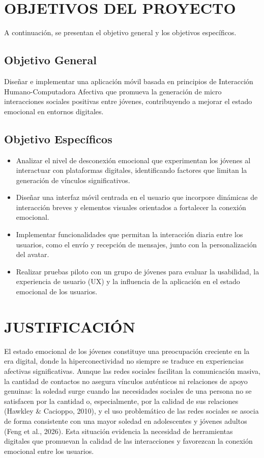 \section{OBJETIVOS DEL PROYECTO}
A continuación, se presentan el objetivo general y los objetivos específicos.

\subsection{Objetivo General}
Diseñar e implementar una aplicación móvil basada en principios de Interacción Humano-Computadora Afectiva que promueva la generación de micro interacciones sociales positivas entre jóvenes, contribuyendo a mejorar el estado emocional en entornos digitales.

\subsection{Objetivo Específicos}
\begin{itemize}
    \item Analizar el nivel de desconexión emocional que experimentan los jóvenes al interactuar con plataformas digitales, identificando factores que limitan la generación de vínculos significativos.
    \item Diseñar una interfaz móvil centrada en el usuario que incorpore dinámicas de interacción breves y elementos visuales orientados a fortalecer la conexión emocional.
    \item Implementar funcionalidades que permitan la interacción diaria entre los usuarios, como el envío y recepción de mensajes, junto con la personalización del avatar.
    \item Realizar pruebas piloto con un grupo de jóvenes para evaluar la usabilidad, la experiencia de usuario (UX) y la influencia de la aplicación en el estado emocional de los usuarios.
\end{itemize}

\section{JUSTIFICACIÓN}
El estado emocional de los jóvenes constituye una preocupación creciente en la era digital, donde la hiperconectividad no siempre se traduce en experiencias afectivas significativas. Aunque las redes sociales facilitan la comunicación masiva, la cantidad de contactos no asegura vínculos auténticos ni relaciones de apoyo genuinas: la soledad surge cuando las necesidades sociales de una persona no se satisfacen por la cantidad o, especialmente, por la calidad de sus relaciones (Hawkley \& Cacioppo, 2010), y el uso problemático de las redes sociales se asocia de forma consistente con una mayor soledad en adolescentes y jóvenes adultos (Feng et al., 2026). Esta situación evidencia la necesidad de herramientas digitales que promuevan la calidad de las interacciones y favorezcan la conexión emocional entre los usuarios.

